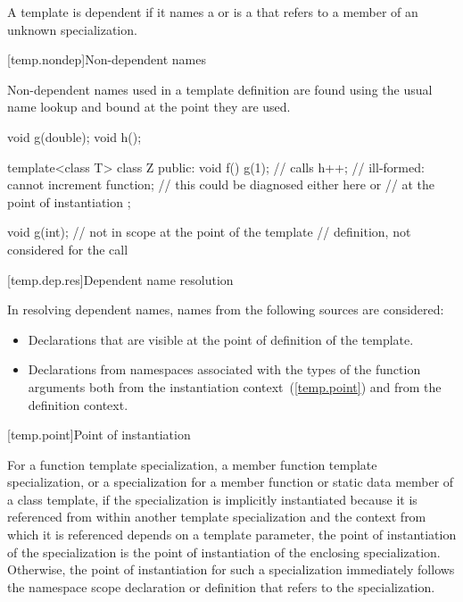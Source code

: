 \pnum
A template
is dependent if it names a
or is a
that refers to a member of an unknown specialization.

[temp.nondep]{Non-dependent names}

\pnum
Non-dependent names used in a template definition are found using the
usual name lookup and bound at the point they are used.
\enterexample

\begin{codeblock}
void g(double);
void h();

template<class T> class Z {
public:
  void f() {
    g(1);           // calls 
    h++;            // ill-formed: cannot increment function;
                    // this could be diagnosed either here or
                    // at the point of instantiation
  }
};

void g(int);        // not in scope at the point of the template
                    // definition, not considered for the call 
\end{codeblock}
\exitexample

[temp.dep.res]{Dependent name resolution}

\pnum
{}%
In resolving dependent names, names from the following sources are considered:

\begin{itemize}
\item
Declarations that are visible at the point of definition of the
template.
\item
Declarations from namespaces associated with the types of the
function arguments both from the instantiation context~(\ref{temp.point})
and from the definition context.
\end{itemize}

[temp.point]{Point of instantiation}

\pnum
{}%
For a function template specialization, a member function template
specialization, or a specialization for a member function or static data member
of a class template,
if the specialization is implicitly instantiated because it is referenced
from within another template specialization and
the context from which it is referenced depends on a template parameter,
the point of instantiation of the specialization is the point of instantiation
of the enclosing specialization.
Otherwise, the point of instantiation for such a specialization immediately
follows the namespace scope declaration
or definition that refers to the specialization.

